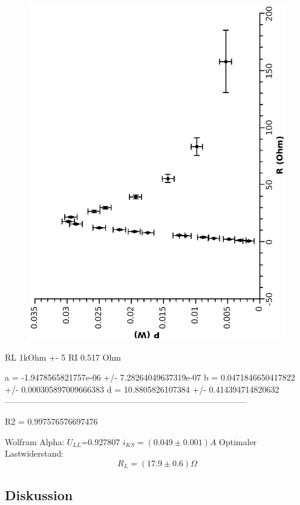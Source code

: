 \documentclass{article}
\begin{document}
\begin{center}
\begin{figure}
\includegraphics[scale=0.7,angle=-90]{leistung.eps}
\end{figure}
\end{center}


RL 1kOhm +- 5%
RI 0.517 Ohm


a  = -1.9478565821757e-06 +/- 7.28264049637319e-07
b  = 0.0471846650417822 +/- 0.000305897009666383
d  = 10.8805826107384 +/- 0.414394714820632
--------------------------------------------------------------------------------------

R2 = 0.997576576697476

Wolfram Alpha: $U_{LL}$=0.927807
$i_{KS}=(0.049\pm0.001)A$
Optimaler Lastwiderstand:
$$R_L=(17.9 \pm 0.6) \Omega $$
\subsection{Diskussion}
\end{document}
